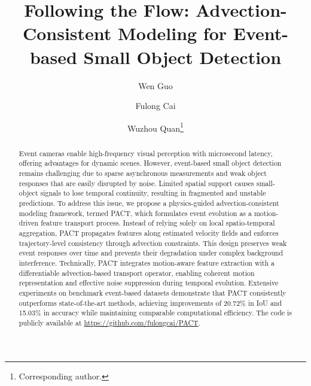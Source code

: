 \documentclass[runningheads]{llncs}
\begin{document}
\title{Following the Flow: Advection-Consistent Modeling for Event-based Small Object Detection}


\author{
Wen Guo
\and
Fulong Cai
\and
Wuzhou Quan\thanks{Corresponding author.}
}

\maketitle


\begin{abstract}
Event cameras enable high-frequency visual perception with microsecond latency, offering advantages for dynamic scenes. However, event-based small object detection remains challenging due to sparse asynchronous measurements and weak object responses that are easily disrupted by noise. Limited spatial support causes small-object signals to lose temporal continuity, resulting in fragmented and unstable predictions.
To address this issue, we propose a physics-guided advection-consistent modeling framework, termed PACT, which formulates event evolution as a motion-driven feature transport process. Instead of relying solely on local spatio-temporal aggregation, PACT propagates features along estimated velocity fields and enforces trajectory-level consistency through advection constraints. This design preserves weak event responses over time and prevents their degradation under complex background interference.
Technically, PACT integrates motion-aware feature extraction with a differentiable advection-based transport operator, enabling coherent motion representation and effective noise suppression during temporal evolution.
Extensive experiments on benchmark event-based datasets demonstrate that PACT consistently outperforms state-of-the-art methods, achieving improvements of 20.72\% in IoU and 15.03\% in accuracy while maintaining comparable computational efficiency. 
The code is publicly available at \url{https://github.com/fulongcai/PACT}.
\end{abstract}
\end{document}
